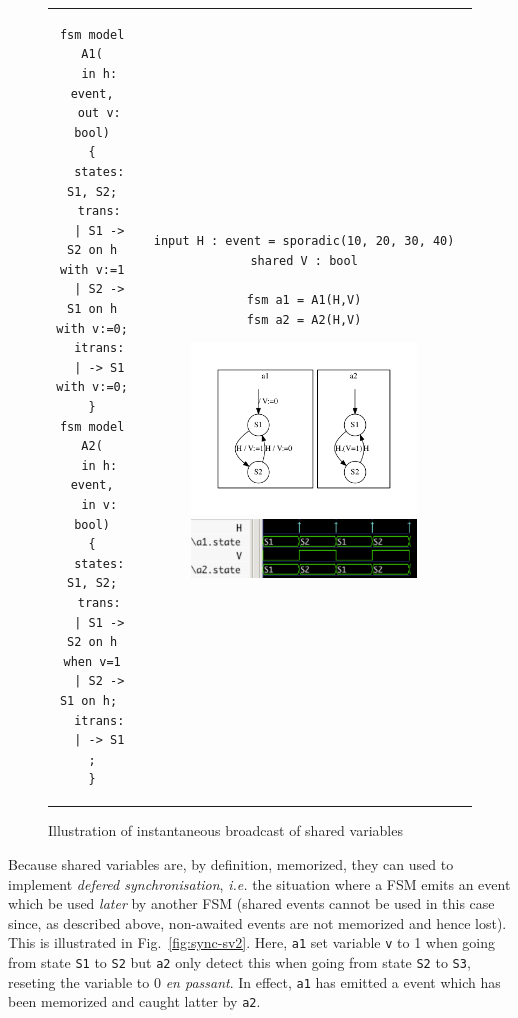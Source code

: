 \begin{figure}[h]
  \centering
\begin{tabular}[c]{cc}
  \begin{minipage}[b]{0.3\linewidth}
  \begin{lstlisting}[language=Rfsm]
fsm model A1(
  in h: event,
  out v: bool)
{
  states: S1, S2;
  trans:
  | S1 -> S2 on h with v:=1
  | S2 -> S1 on h with v:=0;
  itrans:
  | -> S1 with v:=0;
}
fsm model A2(
  in h: event,
  in v: bool)
{
  states: S1, S2;
  trans:
  | S1 -> S2 on h when v=1
  | S2 -> S1 on h; 
  itrans:
  | -> S1 ;
}
  \end{lstlisting}
  \end{minipage} &
  \begin{minipage}[b]{0.7\linewidth}
\begin{lstlisting}[language=Rfsm]
input H : event = sporadic(10, 20, 30, 40)
shared V : bool

fsm a1 = A1(H,V)
fsm a2 = A2(H,V)
\end{lstlisting}
\includegraphics[width=0.7\textwidth]{figs/sync-sv1-model}
\includegraphics[width=0.7\textwidth]{figs/sync-sv1-chrono}
  \end{minipage}
\end{tabular}
  \caption{Illustration of instantaneous broadcast of shared variables}
  \label{fig:sync-sv1}
\end{figure}

\bigskip Because shared variables are, by definition, memorized, they can used to implement
\emph{defered synchronisation}, \emph{i.e.} the situation where a FSM emits an event which be used
\emph{later} by another FSM (shared events cannot be used in this case since, as described above,
non-awaited events are not memorized and hence lost). This is illustrated in
Fig.~\ref{fig:sync-sv2}. Here, \texttt{a1} set variable \texttt{v} to 1 when going from state
\texttt{S1} to \texttt{S2} but \texttt{a2} only detect this when going from state \texttt{S2} to
\texttt{S3}, reseting the variable to 0 \emph{en passant}. In effect, \texttt{a1} has emitted a
event which has been memorized and caught latter by \texttt{a2}.

